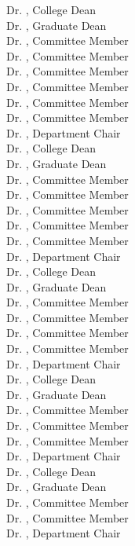 \begin{titlepage}
Dr. \colldean, College Dean\\
Dr. \graddean, Graduate Dean\\
\else
\ifdefined\commemf
\noindent
Dr. \commema, Committee Member\\
Dr. \commemb, Committee Member\\
Dr. \commemc, Committee Member\\
Dr. \commemd, Committee Member\\
Dr. \commeme, Committee Member\\
Dr. \commemf, Committee Member\\
Dr. \depchair, Department Chair\\
Dr. \colldean, College Dean\\
Dr. \graddean, Graduate Dean\\
\else
\ifdefined\commeme
Dr. \commema, Committee Member\\
Dr. \commemb, Committee Member\\
Dr. \commemc, Committee Member\\
Dr. \commemd, Committee Member\\
Dr. \commeme, Committee Member\\
Dr. \depchair, Department Chair\\
Dr. \colldean, College Dean\\
Dr. \graddean, Graduate Dean\\
\else
\ifdefined\commemd
Dr. \commema, Committee Member\\
Dr. \commemb, Committee Member\\
Dr. \commemc, Committee Member\\
Dr. \commemd, Committee Member\\
Dr. \depchair, Department Chair\\
Dr. \colldean, College Dean\\
Dr. \graddean, Graduate Dean\\
\else
\ifdefined\commemc
Dr. \commema, Committee Member\\
Dr. \commemb, Committee Member\\
Dr. \commemc, Committee Member\\
Dr. \depchair, Department Chair\\
Dr. \colldean, College Dean\\
Dr. \graddean, Graduate Dean\\
\else
\ifdefined\commemb
Dr. \commema, Committee Member\\
Dr. \commemb, Committee Member\\
Dr. \depchair, Department Chair\\

\end{titlepage}

